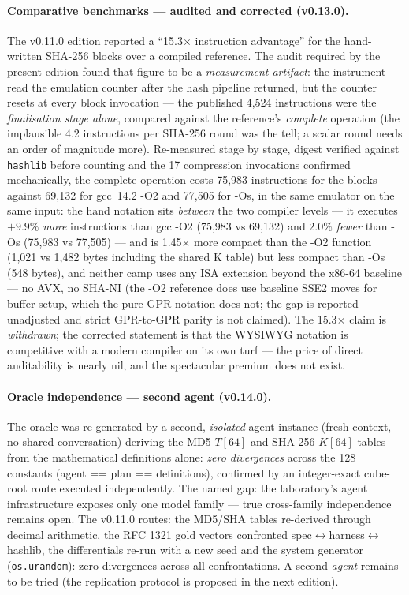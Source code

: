 \documentclass[11pt,a4paper]{article}
\newcommand{\code}[1]{\texttt{\small #1}}
\begin{document}
\paragraph{Comparative benchmarks --- audited and corrected (v0.13.0).} The
v0.11.0 edition reported a ``15.3$\times$ instruction advantage'' for
the hand-written SHA-256 blocks over a compiled reference. The audit
required by the present edition found that figure to be a \emph{measurement
artifact}: the instrument read the emulation counter after the hash
pipeline returned, but the counter resets at every block invocation ---
the published 4{,}524 instructions were the \emph{finalisation stage
alone}, compared against the reference's \emph{complete} operation (the
implausible 4.2 instructions per SHA-256 round was the tell; a scalar
round needs an order of magnitude more). Re-measured stage by stage,
digest verified against \code{hashlib} before counting and the 17
compression invocations confirmed mechanically, the complete operation
costs 75{,}983 instructions for the blocks against 69{,}132 for
gcc~14.2 -O2 and 77{,}505 for -Os, in the same emulator on the same
input: the hand notation sits \emph{between} the two compiler levels
--- it executes $+9.9\%$ \emph{more} instructions than gcc -O2
(75{,}983 vs 69{,}132) and $2.0\%$ \emph{fewer} than -Os (75{,}983 vs
77{,}505) --- and is
1.45$\times$ more compact than the -O2 function (1{,}021 vs 1{,}482
bytes including the shared K table) but less compact than -Os (548
bytes), and neither camp uses any ISA extension beyond the x86-64
baseline --- no AVX, no SHA-NI (the -O2 reference does use baseline SSE2
moves for buffer setup, which the pure-GPR notation does not; the gap
is reported unadjusted and strict GPR-to-GPR parity is not claimed).
The 15.3$\times$ claim is \emph{withdrawn}; the corrected statement is
that the WYSIWYG notation is competitive with a modern compiler on its
own turf --- the price of direct auditability is nearly nil, and the
spectacular premium does not exist.

\paragraph{Oracle independence --- second agent (v0.14.0).} The oracle was
re-generated by a second, \emph{isolated} agent instance (fresh context,
no shared conversation) deriving the MD5 $T[64]$ and SHA-256 $K[64]$
tables from the mathematical definitions alone: \emph{zero divergences}
across the 128 constants (agent == plan == definitions), confirmed by an
integer-exact cube-root route executed independently. The named gap:
the laboratory's agent infrastructure exposes only one model family ---
true cross-family independence remains open. The v0.11.0 routes: the
MD5/SHA tables re-derived
through decimal arithmetic, the RFC 1321 gold vectors confronted
spec$\leftrightarrow$\allowbreak harness$\leftrightarrow$\allowbreak hashlib, the differentials
re-run with a new seed and the system generator (\code{os.urandom}):
zero divergences across all confrontations. A second \emph{agent} remains
to be tried (the replication protocol is proposed in the next edition).
\end{document}
